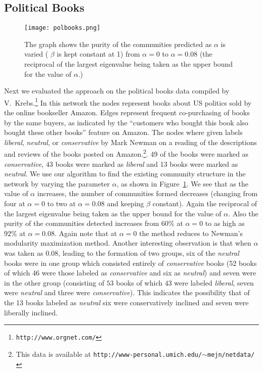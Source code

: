 \documentclass{sig-alternate}
\newcommand{\figref}[1]{Figure~\ref{#1}}
\begin{document}
\subsection{Political Books}
  \begin{figure}[tbh]
\texttt{[image: polbooks.png]}
 \caption{The graph shows the purity of the communities predicted as $\alpha$ is varied ( $\beta$ is kept constant at 1) from $\alpha=0$ to $\alpha=0.08$ (the reciprocal of the largest eigenvalue being taken as the upper bound for the value of $\alpha$.)}
 \label{fig:polbooks}
 \end{figure}

Next we evaluated the approach on the political books data compiled by V.~Krebs.\footnote{\texttt{http://www.orgnet.com/}} In this network the nodes represent books about US politics sold by the online bookseller Amazon. Edges represent frequent co-purchasing of books by the same buyers, as indicated by the ``customers who bought this book also bought these other books'' feature on Amazon. The nodes where given labels \emph{liberal}, \emph{neutral}, or \emph{conservative} by Mark Newman on a reading of the descriptions and reviews of the books posted on Amazon.\footnote{This data is available at \texttt{http://www-personal.umich.edu/$\sim$mejn/netdata/}}. 49 of the books were marked as \emph{conservative}, $43$ books were marked as \emph{liberal} and 13 books were marked as \emph{neutral}. We use our algorithm to find the existing community structure in the network by varying the parameter $\alpha$, as shown in \figref{fig:polbooks}.
We see that as the value of $\alpha$ increases, the number of communities formed decreases (changing from four at $\alpha=0$ to two at $\alpha=0.08$ and keeping $\beta $ constant). Again the reciprocal of the largest eigenvalue being taken as the upper bound for the value of $\alpha$. Also the purity of the communities detected increases from $60\%$ at $\alpha=0$ to as high as $92\%$ at $\alpha=0.08$. Again note that at $\alpha=0$ the method reduces to Newman's modularity maximization method. Another interesting observation is that  when $\alpha$  was taken as $0.08$, leading to the formation of two groups, six of the \emph{neutral} books were  in one group which consisted entirely of \emph{conservative} books (52 books of which 46 were those labeled as  \emph{conservative} and six as \emph{neutral}) and seven were  in the other group (consisting of $53$ books  of  which $43$ were labeled \emph{liberal}, seven were \emph{neutral} and  three were \emph{conservative}). This indicates the possibility that of the 13 books labeled as \emph{neutral}  six  were conservatively inclined and seven were liberally inclined.
\end{document}
